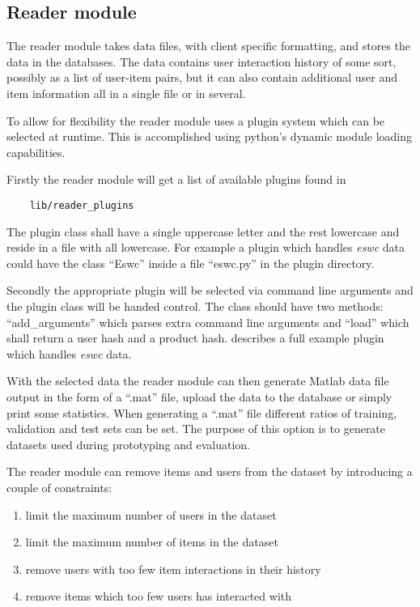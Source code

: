 
\subsection{Reader module}\label{sec:recsys:reader}

The reader module takes data files, with client specific formatting, and stores the data in the databases. The data contains user interaction history of some sort, possibly as a list of user-item pairs, but it can also contain additional user and item information all in a single file or in several.

To allow for flexibility the reader module uses a plugin system which can be selected at runtime. This is accomplished using python's dynamic module loading capabilities.

Firstly the reader module will get a list of available plugins found in

\begin{lstlisting}
    lib/reader_plugins
\end{lstlisting}

The plugin class shall have a single uppercase letter and the rest lowercase and reside in a file with all lowercase. For example a plugin which handles \textit{eswc} data could have the class ``Eswc'' inside a file ``eswc.py'' in the plugin directory.

Secondly the appropriate plugin will be selected via command line arguments and the plugin class will be handed control. The class should have two methods: ``add\_arguments'' which parses extra command line arguments and ``load'' which shall return a user hash and a product hash.  describes a full example plugin which handles \textit{eswc} data.

With the selected data the reader module can then generate Matlab data file output in the form of a ``.mat'' file, upload the data to the database or simply print some statistics. When generating a ``.mat'' file different ratios of training, validation and test sets can be set. The purpose of this option is to generate datasets used during prototyping and evaluation.

The reader module can remove items and users from the dataset by introducing a couple of constraints:

\begin{enumerate}
    \item limit the maximum number of users in the dataset
    \item limit the maximum number of items in the dataset
    \item remove users with too few item interactions in their history
    \item remove items which too few users has interacted with
\end{enumerate}

